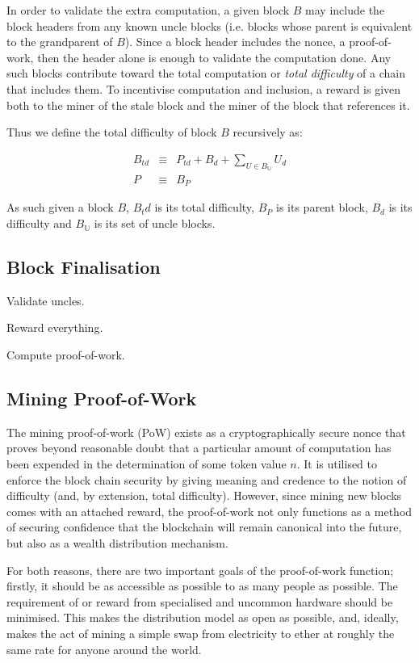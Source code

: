 \documentclass[9pt,oneside]{amsart}
\begin{document}
\begin{multicols}{2}
In order to validate the extra computation, a given block $B$ may include the block headers from any known uncle blocks (i.e. blocks whose parent is equivalent to the grandparent of $B$). Since a block header includes the nonce, a proof-of-work, then the header alone is enough to validate the computation done. Any such blocks contribute toward the total computation or \textit{total difficulty} of a chain that includes them. To incentivise computation and inclusion, a reward is given both to the miner of the stale block and the miner of the block that references it.

Thus we define the total difficulty of block $B$ recursively as:

\begin{eqnarray}
B_{td} & \equiv & P_{td} + B_d + \sum\limits_{U \in B_\mathbb{U}} U_d \\
P & \equiv & B_P
\end{eqnarray}

As such given a block $B$, $B_td$ is its total difficulty, $B_P$ is its parent block, $B_d$ is its difficulty and $B_\mathbb{U}$ is its set of uncle blocks.

\subsection{Block Finalisation} \label{ch:finalisation}

Validate uncles.

Reward everything.

Compute proof-of-work.

\subsection{Mining Proof-of-Work} \label{ch:pow}

The mining proof-of-work (PoW) exists as a cryptographically secure nonce that proves beyond reasonable doubt that a particular amount of computation has been expended in the determination of some token value $n$. It is utilised to enforce the block chain security by giving meaning and credence to the notion of difficulty (and, by extension, total difficulty). However, since mining new blocks comes with an attached reward, the proof-of-work not only functions as a method of securing confidence that the blockchain will remain canonical into the future, but also as a wealth distribution mechanism.

For both reasons, there are two important goals of the proof-of-work function; firstly, it should be as accessible as possible to as many people as possible. The requirement of or reward from specialised and uncommon hardware should be minimised. This makes the distribution model as open as possible, and, ideally, makes the act of mining a simple swap from electricity to ether at roughly the same rate for anyone around the world.


\end{multicols}
\end{document}
